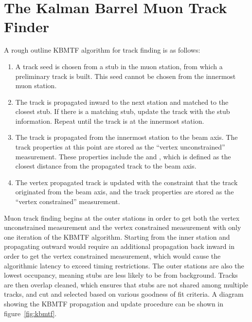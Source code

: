 \section{The Kalman Barrel Muon Track Finder} \label{sec:kbmtf}
A rough outline KBMTF algorithm for track finding is as follows:
\begin{enumerate}
	\item A track seed is chosen from a stub in the muon station, from which a preliminary track is built. This seed cannot be chosen from the innermost muon station.
	\item The track is propagated inward to the next station and matched to the closest stub. If there is a matching stub, update the track with the stub information. Repeat until the track is at the innermost station. \label{kbmtf_step2}
	\item The track is propagated from the innermost station to the beam axis. The track properties at this point are stored as the ``vertex unconstrained'' measurement. These properties include the \pt and \dxy, which is defined as the closest distance from the propagated track to the beam axis. \label{kbmtf_step3}
	\item The vertex propagated track is updated with the constraint that the track originated from the beam axis, and the track properties are stored as the ``vertex constrained'' measurement. \label{kbmtf_step4}
\end{enumerate}

Muon track finding begins at the outer stations in order to get both the vertex unconstrained measurement and the vertex constrained measurement with only one iteration of the KBMTF algorithm. Starting from the inner station and propagating outward would require an additional propagation back inward in order to get the vertex constrained measurement, which would cause the algorithmic latency to exceed timing restrictions. The outer stations are also the lowest occupancy, meaning stubs are less likely to be from background. Tracks are then overlap cleaned, which ensures that stubs are not shared among multiple tracks, and cut and selected based on various goodness of fit criteria. A diagram showing the KBMTF propagation and update procedure can be shown in figure~\ref{fig:kbmtf}.

